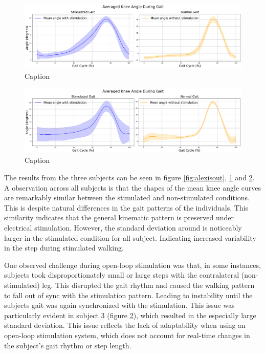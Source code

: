 \begin{figure}[h]
    \centering
    \includegraphics[width=0.99\linewidth]{images/katlaoutput1.png}
    \caption{Caption}
    \label{fig:katlaout}
\end{figure}

\begin{figure} [h]
    \centering
    \includegraphics[width=0.99\linewidth]{images/leonioutput1.png}
    \caption{Caption}
    \label{fig:leoniout}
\end{figure}

The results from the three subjects can be seen in figure \ref{fig:alexisout}, \ref{fig:katlaout} and \ref{fig:leoniout}. A observation across all subjects is that the shapes of the mean knee angle curves are remarkably similar between the stimulated and non-stimulated conditions. This is despite natural differences in the gait patterns of the individuals. This similarity indicates that the general kinematic pattern is preserved under electrical stimulation. However, the standard deviation around is noticeably larger in the stimulated condition for all subject. Indicating increased variability in the step during stimulated walking.

One observed challenge during open-loop stimulation was that, in some instances, subjects took disproportionately small or large steps with the contralateral (non-stimulated) leg. This disrupted the gait rhythm and caused the walking pattern to fall out of sync with the stimulation pattern. Leading to instability until the subjects gait was again synchronized with the stimulation. This issue was particularly evident in subject 3 (figure \ref{fig:leoniout}), which resulted in the especially large standard deviation. This issue reflects the lack of adaptability when using an open-loop stimulation system, which does not account for real-time changes in the subject's gait rhythm or step length. 

